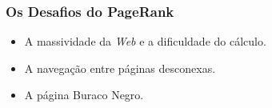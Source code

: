 \documentclass{beamer}
\begin{document}
\begin{frame}
	\frametitle{Os Desafios do PageRank}
	
\begin{itemize}
	\item A massividade da \textit{Web} e a dificuldade do cálculo.
	\vspace{0.2cm}		
	\item A navegação entre páginas desconexas.
	\vspace{0.2cm}	
	\item A página Buraco Negro.
\end{itemize}	


\end{frame}
\end{document}
